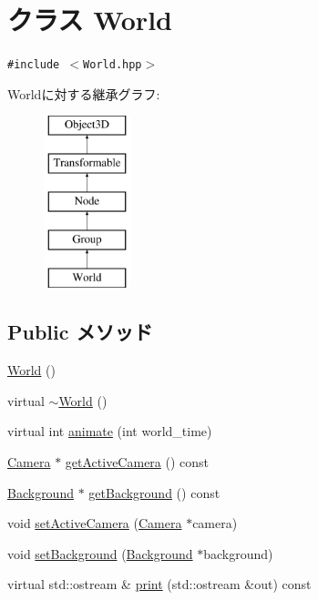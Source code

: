 \hypertarget{classm3g_1_1World}{
\section{クラス World}
\label{classm3g_1_1World}
}
{\tt \#include $<$World.hpp$>$}

Worldに対する継承グラフ:\begin{figure}[H]
\begin{center}
\leavevmode
\includegraphics[height=5cm]{classm3g_1_1World}
\end{center}
\end{figure}
\subsection*{Public メソッド}
\begin{CompactItemize}
\item 
\hyperlink{classm3g_1_1World_75e827b8787e735882f60c266d58e02e}{World} ()
\item 
virtual \hyperlink{classm3g_1_1World_bd170ded455f0b2273c1fe06da6ea0cb}{$\sim$World} ()
\item 
virtual int \hyperlink{classm3g_1_1World_8aad1ceab4c2a03609c8a42324ce484d}{animate} (int world\_\-time)
\item 
\hyperlink{classm3g_1_1Camera}{Camera} $\ast$ \hyperlink{classm3g_1_1World_812e01ec4fd0fd872b0ca5ea6a30b2f6}{getActiveCamera} () const 
\item 
\hyperlink{classm3g_1_1Background}{Background} $\ast$ \hyperlink{classm3g_1_1World_fb10ab7fd2ad14b7b1d49caf129670e0}{getBackground} () const 
\item 
void \hyperlink{classm3g_1_1World_dd9a82b335e8521592ad410c662a5cfd}{setActiveCamera} (\hyperlink{classm3g_1_1Camera}{Camera} $\ast$camera)
\item 
void \hyperlink{classm3g_1_1World_6193765c76d6dc0450f264918ebe7e1c}{setBackground} (\hyperlink{classm3g_1_1Background}{Background} $\ast$background)
\item 
virtual std::ostream \& \hyperlink{classm3g_1_1World_6fea17fa1532df3794f8cb39cb4f911f}{print} (std::ostream \&out) const 
\end{CompactItemize}
